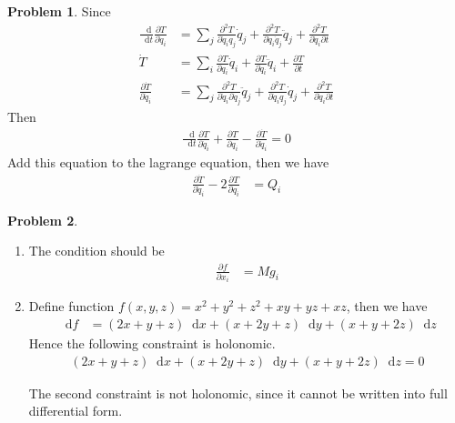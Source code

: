 \documentclass[twoside,11pt]{article}
\renewcommand*\d{\mathop{}\!\mathrm{d}}
\theoremstyle{definition}
\newtheorem{problem}{Problem}
\theoremstyle{remark}
\begin{document}
\begin{problem}
Since
\begin{align*}
    \frac{\d}{\d t}\frac{\partial T}{\partial\dot{q}_i} &= 
    \sum_j
    \frac{\partial^2 T}{\partial\dot{q}_i q_j}\dot{q}_j +
    \frac{\partial^2 T}{\partial\dot{q}_i \dot{q}_j}\ddot{q}_j
    + \frac{\partial^2 T}{\partial\dot{q}_i\partial t}\\
    \dot{T} &= \sum_i\frac{\partial T}{\partial q_i}\dot{q}_i
    + \frac{\partial T}{\partial\dot{q}_i}\ddot{q}_i
    + \frac{\partial T}{\partial t}\\
    \frac{\partial\dot{T}}{\partial\dot{q}_i} &=
    \sum_j\frac{\partial^2 T}{\partial\dot{q}_i\partial\dot{q}_j}\ddot{q}_j
    + \frac{\partial^2 T}{\partial\dot{q}_i q_j}\dot{q}_j
    + \frac{\partial^2 T}{\partial\dot{q}_i\partial t}
\end{align*}
Then
\begin{align*}
    \frac{\d}{\d t}\frac{\partial T}{\partial \dot{q}_i}
    + \frac{\partial T}{\partial q_i}
    - \frac{\partial\dot{T}}{\partial\dot{q}_i} 
    = 0
\end{align*}
Add this equation to the lagrange equation, then we have
\begin{align*}
    \frac{\partial\dot{T}}{\partial\dot{q}_i}
    - 2\frac{\partial T}{\partial q_i} &= Q_i
\end{align*}

\end{problem}


\begin{problem}\
\begin{enumerate}[label=(\alph*)]
\item The condition should be
\begin{align*}
    \frac{\partial f}{\partial x_i} &= 
    Mg_i
\end{align*}

\item Define function $f(x, y, z) = x^2+y^2+z^2+xy+yz+xz$, then we have
\begin{align*}
    \d f &= 
    (2x+y+z)\d x + (x+2y+z)\d y + (x+y+2z)\d z
\end{align*}
Hence the following constraint is holonomic.
\begin{align*}
    (2x+y+z)\d x + (x+2y+z)\d y + (x+y+2z)\d z = 0
\end{align*}

The second constraint is not holonomic, since it cannot be written 
into full differential form.

\end{enumerate}
\end{problem}
\end{document}
